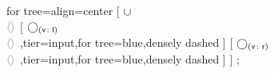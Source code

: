 \documentclass[varwidth=100cm,convert={density=120}]{standalone}
\begin{document}
	\begin{preview}
		\begin{forest} for tree={align=center}
			[
			{$\cup$ \\
				\footnotesize $\color{gray} \langle \var{} \rangle$
			}
			[
			{$\getvertices{v}{l}$ \\
				\footnotesize $\color{gray} \langle \var{} \rangle$
			},tier=input,for tree={blue,densely dashed}
			]
			[
			{$\getvertices{v}{r}$ \\
				\footnotesize $\color{gray} \langle \var{} \rangle$
			},tier=input,for tree={blue,densely dashed}
			]
			]
			;
		\end{forest}
	\end{preview}
\end{document}

